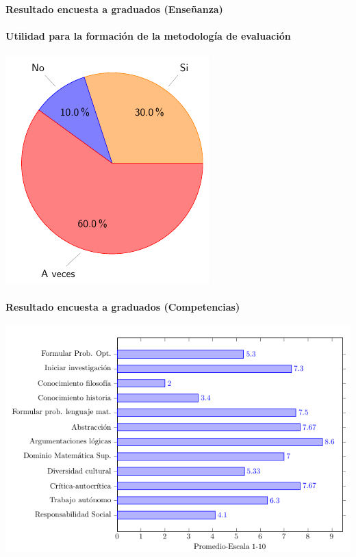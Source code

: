 \documentclass[a4paper,10pt,BCOR10mm,oneside,headsepline]{scrbook}
\begin{document}
\paragraph{Resultado encuesta a graduados (Enseñanza)}
\paragraph{ Utilidad para la formación de la metodología de evaluación}
\begin{center}
  \includegraphics[scale=.5]{torta5.png}
\end{center}








\paragraph{Resultado encuesta a graduados (Competencias)}



\begin{center}
 \includegraphics[scale=.5]{barras4.png}
\end{center} 
\end{document}
